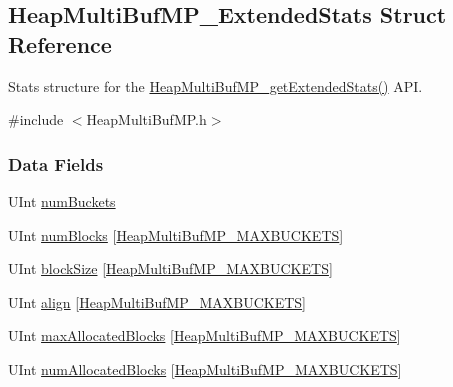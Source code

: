 \subsection{Heap\-Multi\-Buf\-M\-P\-\_\-\-Extended\-Stats Struct Reference}
\label{struct_heap_multi_buf_m_p___extended_stats}


Stats structure for the \hyperlink{_heap_multi_buf_m_p_8h_a386420101752537b59e12520aafd9b0d}{Heap\-Multi\-Buf\-M\-P\-\_\-get\-Extended\-Stats()} A\-P\-I.  




{\ttfamily \#include $<$Heap\-Multi\-Buf\-M\-P.\-h$>$}

\subsubsection*{Data Fields}
\begin{DoxyCompactItemize}
\item 
U\-Int \hyperlink{struct_heap_multi_buf_m_p___extended_stats_a67a4abac5bfe360b37989a60d4a4cfb4}{num\-Buckets}
\item 
U\-Int \hyperlink{struct_heap_multi_buf_m_p___extended_stats_a084ca66b6b093779c105a1846eae6bd4}{num\-Blocks} \mbox{[}\hyperlink{_heap_multi_buf_m_p_8h_adf1fa817a6a12132b7293ec1fc1c8bf4}{Heap\-Multi\-Buf\-M\-P\-\_\-\-M\-A\-X\-B\-U\-C\-K\-E\-T\-S}\mbox{]}
\item 
U\-Int \hyperlink{struct_heap_multi_buf_m_p___extended_stats_a2477f91b9b48ec54b5f14f5c808e1678}{block\-Size} \mbox{[}\hyperlink{_heap_multi_buf_m_p_8h_adf1fa817a6a12132b7293ec1fc1c8bf4}{Heap\-Multi\-Buf\-M\-P\-\_\-\-M\-A\-X\-B\-U\-C\-K\-E\-T\-S}\mbox{]}
\item 
U\-Int \hyperlink{struct_heap_multi_buf_m_p___extended_stats_a6ba215fe07dc8a00e8eb8cf75cf1d81c}{align} \mbox{[}\hyperlink{_heap_multi_buf_m_p_8h_adf1fa817a6a12132b7293ec1fc1c8bf4}{Heap\-Multi\-Buf\-M\-P\-\_\-\-M\-A\-X\-B\-U\-C\-K\-E\-T\-S}\mbox{]}
\item 
U\-Int \hyperlink{struct_heap_multi_buf_m_p___extended_stats_af3ef9e5df01faaffdead0223f75b9884}{max\-Allocated\-Blocks} \mbox{[}\hyperlink{_heap_multi_buf_m_p_8h_adf1fa817a6a12132b7293ec1fc1c8bf4}{Heap\-Multi\-Buf\-M\-P\-\_\-\-M\-A\-X\-B\-U\-C\-K\-E\-T\-S}\mbox{]}
\item 
U\-Int \hyperlink{struct_heap_multi_buf_m_p___extended_stats_a6e1fab6694ccbea899c34a9c11e207e4}{num\-Allocated\-Blocks} \mbox{[}\hyperlink{_heap_multi_buf_m_p_8h_adf1fa817a6a12132b7293ec1fc1c8bf4}{Heap\-Multi\-Buf\-M\-P\-\_\-\-M\-A\-X\-B\-U\-C\-K\-E\-T\-S}\mbox{]}
\end{DoxyCompactItemize}


